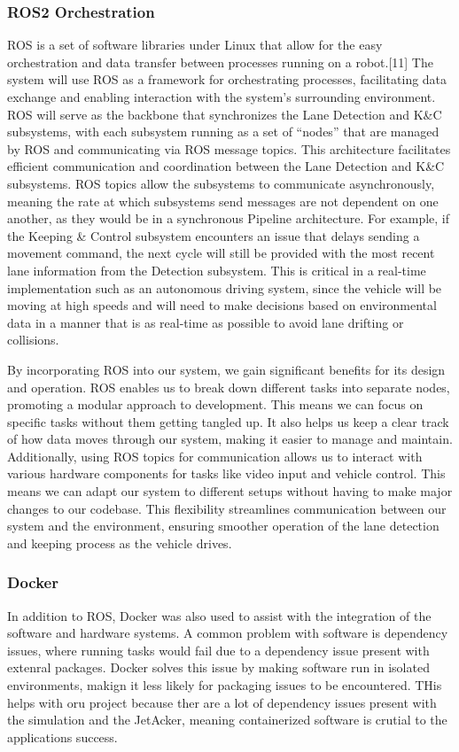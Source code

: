 \documentclass[titlepage]{article}
\begin{document}
\subsubsection{ROS2 Orchestration}
ROS is a set of software libraries under Linux that allow for the easy orchestration and data transfer between processes running on a robot.[11] The system will use ROS as a framework for orchestrating processes, facilitating data exchange and enabling interaction with the system’s surrounding environment. ROS will serve as the backbone that synchronizes the Lane Detection and K\&C subsystems, with each subsystem running as a set of “nodes” that are managed by ROS and communicating via ROS message topics. This architecture facilitates efficient communication and coordination between the Lane Detection and K\&C subsystems. ROS topics allow the subsystems to communicate asynchronously, meaning the rate at which subsystems send messages are not dependent on one another, as they would be in a synchronous Pipeline architecture. For example, if the Keeping \& Control subsystem encounters an issue that delays sending a movement command, the next cycle will still be provided with the most recent lane information from the Detection subsystem. This is critical in a real-time implementation such as an autonomous driving system, since the vehicle will be moving at high speeds and will need to make decisions based on environmental data in a manner that is as real-time as possible to avoid lane drifting or collisions.

By incorporating ROS into our system, we gain significant benefits for its design and operation. ROS enables us to break down different tasks into separate nodes, promoting a modular approach to development. This means we can focus on specific tasks without them getting tangled up. It also helps us keep a clear track of how data moves through our system, making it easier to manage and maintain. Additionally, using ROS topics for communication allows us to interact with various hardware components for tasks like video input and vehicle control. This means we can adapt our system to different setups without having to make major changes to our codebase. This flexibility streamlines communication between our system and the environment, ensuring smoother operation of the lane detection and keeping process as the vehicle drives.


\subsubsection{Docker}
In addition to ROS, Docker was also used to assist with the integration of the software and hardware systems. A common problem with software is dependency issues, where running tasks would fail due to a dependency issue present with extenral packages. Docker solves this issue by making software run in isolated environments, makign it less likely for packaging issues to be encountered. THis helps with oru project because ther are a lot of dependency issues present with the simulation and the JetAcker, meaning containerized software is crutial to the applications success.
\end{document}
